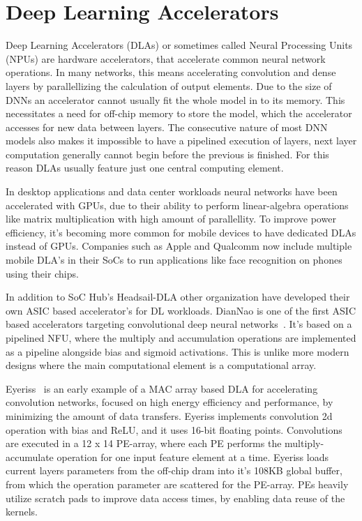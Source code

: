 \documentclass[12pt,a4paper,english
]{tunithesis}
\begin{document}
\section{Deep Learning Accelerators}
\label{sec:dlas}
Deep Learning Accelerators (DLAs) or sometimes called Neural Processing Units (NPUs) are hardware accelerators, that accelerate common neural network operations. In many networks, this means accelerating convolution and dense layers by parallellizing the calculation of output elements. Due to the size of DNNs an accelerator cannot usually fit the whole model in to its memory. This necessitates a need for off-chip memory to store the model, which the accelerator accesses for new data between layers. The consecutive nature of most DNN models also makes it impossible to have a pipelined execution of layers, next layer computation generally cannot begin before the previous is finished. For this reason DLAs usually feature just one central computing element.

In desktop applications and data center workloads neural networks have been accelerated with GPUs, due to their ability to perform linear-algebra operations like matrix multiplication with high amount of parallellity. To improve power efficiency, it's becoming more common for mobile devices to have dedicated DLAs instead of GPUs. Companies such as Apple and Qualcomm now include multiple mobile DLA's in their SoCs to run applications like face recognition on phones using their chips.

In addition to SoC Hub's Headsail-DLA other organization have developed their own ASIC based accelerator's for DL workloads.
DianNao is one of the first ASIC based accelerators targeting convolutional deep neural networks~\cite{chen_diannao_2014}. It's based on a pipelined NFU, where the multiply and accumulation operations are implemented as a pipeline alongside bias and sigmoid activations. This is unlike more modern designs where the main computational element is a computational array.

Eyeriss~\cite{chen_eyeriss_2017} is an early example of a MAC array based DLA for accelerating convolution networks, focused on high energy efficiency and performance, by minimizing the amount of data transfers. Eyeriss implements convolution 2d operation with bias and ReLU, and it uses 16-bit floating points. Convolutions are executed in a 12 x 14 PE-array, where each PE performs the multiply-accumulate operation for one input feature element at a time. Eyeriss loads current layers parameters from the off-chip dram into it's 108KB global buffer, from which the operation parameter are scattered for the PE-array. PEs heavily utilize scratch pads to improve data access times, by enabling data reuse of the kernels.
\end{document}
